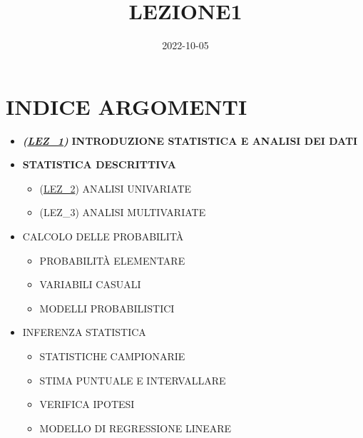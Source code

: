 \documentclass[
]{article}
\title{LEZIONE1}
\author{}
\date{\vspace{-2.5em}2022-10-05}
\begin{document}
\maketitle

\hypertarget{indice-argomenti}{%
\section{INDICE ARGOMENTI}\label{indice-argomenti}}

\begin{itemize}
\item
  \textbf{\emph{(\href{./1_LEZ.pdf}{LEZ\_1})}} \textbf{INTRODUZIONE
  STATISTICA E ANALISI DEI DATI}
\item
  \textbf{STATISTICA DESCRITTIVA}

  \begin{itemize}
  \item
    (\href{./2_LEZ.pdf}{LEZ\_2}) ANALISI UNIVARIATE
  \item
    (LEZ\_3) ANALISI MULTIVARIATE
  \end{itemize}
\item
  CALCOLO DELLE PROBABILITÀ

  \begin{itemize}
  \item
    PROBABILITÀ ELEMENTARE
  \item
    VARIABILI CASUALI
  \item
    MODELLI PROBABILISTICI
  \end{itemize}
\item
  INFERENZA STATISTICA

  \begin{itemize}
  \item
    STATISTICHE CAMPIONARIE
  \item
    STIMA PUNTUALE E INTERVALLARE
  \item
    VERIFICA IPOTESI
  \item
    MODELLO DI REGRESSIONE LINEARE
  \end{itemize}
\end{itemize}
\end{document}
